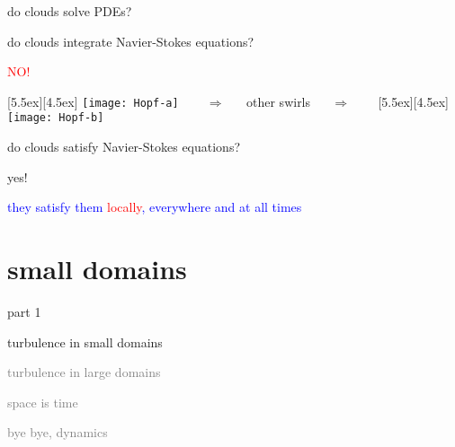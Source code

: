 \begin{frame}{do clouds solve PDEs?}

do clouds integrate Navier-Stokes equations?

\begin{center}
\centerline{\textcolor{red}{\Huge NO!}}

\begin{minipage}[t]{\textwidth}
	\begin{center}
\centerline{
\raisebox{-4.0ex}[5.5ex][4.5ex]
		 {\texttt{[image: Hopf-a]}}
~~~ $\Longrightarrow$ ~~ {other swirls} ~~ $\Longrightarrow$ ~~~
	\raisebox{-4.0ex}[5.5ex][4.5ex]
		 {\texttt{[image: Hopf-b]}}
          }
	\end{center}
\end{minipage}
\end{center}

do clouds satisfy Navier-Stokes equations?

\bigskip

{\Large yes!}

\centerline{
\textcolor{blue}{they satisfy them \textcolor{red}{\large locally}, everywhere and at all times}
}
\end{frame}

\section[turbulence in small domains]
{small domains}
\begin{frame}{part 1}
\begin{enumerate}
              \item {\Large
turbulence in small domains
                  }\textcolor{gray}{\small
              \item
turbulence in large domains
              \item
\catlatt
              \item
space is time
              \item
bye bye, dynamics
                    }
            \end{enumerate}
\end{frame}


